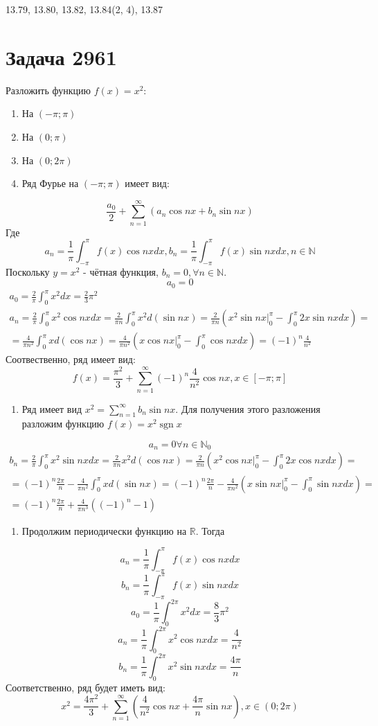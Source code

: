 \documentclass[11pt]{article}
\begin{document}
13.79, 13.80, 13.82, 13.84(2, 4), 13.87
\section{Задача 2961}
\label{sec:org8aeac98}
Разложить функцию \(f(x) = x^2\):
\begin{enumerate}
\item На \((-\pi; \pi)\)
\item На \((0; \pi)\)
\item На \((0; 2\pi)\)

\item Ряд Фурье на \((-\pi; \pi)\) имеет вид:
\end{enumerate}
$$\frac{a_0}2 + \sum_{n = 1}^\infty(a_n\cos nx + b_n\sin nx)$$
Где
$$a_n = \frac{1}\pi \int_{-\pi}^\pi f(x)\cos nx dx, b_n = \frac{1}\pi \int_{-\pi}^\pi f(x)\sin nx dx, n \in \mathbb{N}$$
Поскольку \(y = x^2\) - чётная функция, \(b_n = 0, \forall n \in \mathbb{N}\).
$$a_0 = 0$$
\begin{multline*}
a_0 = \frac{2}\pi \int_0^\pi x^2dx = \frac{2}3\pi^2\\
a_n = \frac{2}\pi \int_0^\pi x^2\cos nx dx = \frac{2}{\pi n}\int_0^\pi x^2d(\sin nx) = \frac{2}{\pi n}\left(x^2\sin nx\bigg|_0^\pi -
\int_0^\pi2x\sin nx dx\right) = \\
 = \frac{4}{\pi n^2}\int_0^\pi xd(\cos nx) = \frac{4}{\pi n^2}\left(x\cos nx\bigg|_0^\pi - \int_0^\pi\cos nxdx\right) = (-1)^{n}\frac{4}{n^2}
\end{multline*}
Соотвественно, ряд имеет вид:
$$f(x) = \frac{\pi^2}{3} + \sum_{n = 1}^\infty(-1)^n\frac{4}{n^2}\cos nx, x \in [-\pi; \pi]$$
\begin{enumerate}
\item Ряд имеет вид \(x^2 = \sum_{n = 1}^\infty b_n\sin nx\). Для получения этого разложения разложим функцию \(f(x) = x^2\operatorname{sgn} x\)
\end{enumerate}
$$a_n = 0 \forall n \in \mathbb{N}_0$$
\begin{multline*}
b_n = \frac{2}\pi\int_0^\pi x^2\sin nxdx = \frac{2}{\pi n} x^2d(\cos nx) = \frac{2}{\pi n}\left(x^2\cos nx\bigg|_0^\pi - \int_0^\pi 2x\cos nxdx\right) = \\
= (-1)^n\frac{2\pi}n - \frac{4}{\pi n^2}\int_0^\pi xd(\sin nx) = (-1)^n\frac{2\pi}n - \frac{4}{\pi n^2}\left(x\sin nx\bigg|_0^\pi - \int_0^\pi\sin nx dx\right) = \\
= (-1)^n\frac{2\pi}n + \frac{4}{\pi n^3}((-1)^n - 1)
\end{multline*}
\begin{enumerate}
\item Продолжим периодически функцию на \(\mathbb{R}\). Тогда
\end{enumerate}
$$a_n = \frac{1}{\pi}\int_{-\pi}^\pi f(x)\cos nxdx$$
$$b_n = \frac{1}{\pi}\int_{-\pi}^\pi f(x)\sin nxdx$$
$$a_0 = \frac{1}\pi\int_0^{2\pi}x^2dx = \frac{8}3\pi^2$$
$$a_n = \frac{1}\pi\int_0^{2\pi}x^2\cos nxdx = \frac{4}{n^2}$$
$$b_n = \frac{1}\pi\int_0^{2\pi}x^2\sin nxdx = \frac{4\pi}n$$
Соответственно, ряд будет иметь вид:
$$x^2 = \frac{4\pi^2}3 + \sum_{n = 1}^\infty\left(\frac{4}{n^2}\cos nx + \frac{4\pi}n\sin nx\right), x \in (0; 2\pi)$$
\end{document}
